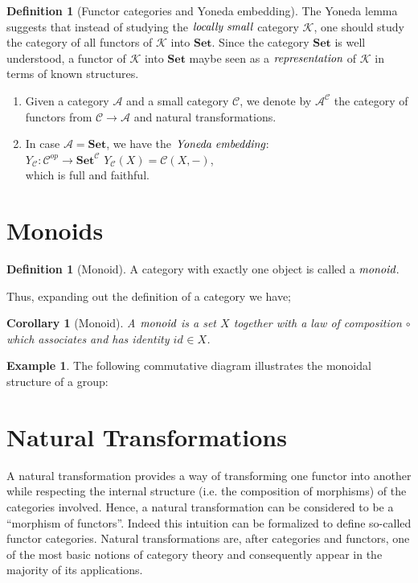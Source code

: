 \documentclass[10pt, oneside, reqno]{amsart}
\theoremstyle{plain}%
\newtheorem*{cor}{Corollary}
\theoremstyle{definition}
\newtheorem{defn}[thm]{Definition}
\newtheorem{exmp}[thm]{Example}
\theoremstyle{remark}
\newcommand{\Id}{\mathit{id}_}
\begin{document}
\begin{defn}[Functor categories and Yoneda embedding]
The Yoneda lemma suggests that instead of studying the $\emph{locally small}$ category $\mathcal{K}$,
one should study the category of all functors of $\mathcal{K}$ into $\textbf{Set}$.
Since the category $\textbf{Set}$ is well understood, a functor of $\mathcal{K}$ into $\textbf{Set}$
maybe seen as a $\emph{representation}$ of $\mathcal{K}$ in terms of known structures. 
 \begin{enumerate}
  \item Given a category $\mathcal{A}$ and a small category $\mathcal{C}$, we denote by
  $\mathcal{A}^\mathcal{C}$ the category of functors from $\mathcal{C} \to \mathcal{A}$ and natural transformations.
  \item In case $\mathcal{A} = \textbf{Set}$, we have the $\emph{Yoneda embedding}$:\\
  $Y_{\mathcal{C}}: \mathcal{C}^{op} \to \textbf{Set}^{\mathcal{C}}
  \, \,
  Y_{\mathcal{C}}(X) = \mathcal{C}(X, -)$,\\
  which is full and faithful.
 \end{enumerate}
\end{defn}


\section{Monoids} %
\label{sec:monoids}

\begin{defn}[Monoid]
 A category with exactly one object is called a $\emph{monoid}$.
\end{defn}

Thus, expanding out the definition of a category we have;
\begin{cor}[Monoid]
 A $\emph{monoid}$ is a set $X$ together with a law of composition $\circ$
 which associates and has identity $\Id{} \in X$.
\end{cor}

\begin{exmp}
 The following commutative diagram illustrates the monoidal structure of a group:
 \monoid{
  (A\otimes A)\otimes A\otimes A &
  A\otimes (A\otimes A) &
  A\otimes A &
  A\otimes A &
  A &
  \mu\otimes \Id{} &
  \Id{} \otimes\mu &
  \mu &
  \mu\otimes \Id{}
 }
\end{exmp}


\section{Natural Transformations} %
\label{sec:natural transformations}
A natural transformation provides a way of transforming one functor into another
while respecting the internal structure (i.e. the composition of morphisms) of the categories involved.
Hence, a natural transformation can be considered to be a ``morphism of functors''.
Indeed this intuition can be formalized to define so-called functor categories.
Natural transformations are, after categories and functors, one of the most basic notions of category theory
and consequently appear in the majority of its applications.
\end{document}
